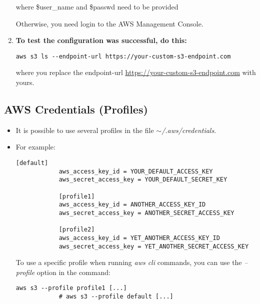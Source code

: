 \documentclass[12pt, a4paper]{article}
\numberwithin{equation}{section}
\theoremstyle{definition}
\theoremstyle{definition}
\begin{document}
\begin{enumerate}
		where \$user\_name and \$passwd need to be provided
		
		Otherwise, you need login to the AWS Management Console. 
		
		\item \textbf{To test the configuration was successful, do this:}
		
		\begin{lstlisting}[style=mystylebash, label=alg:aws_configure_test, xleftmargin=\parindent]
			aws s3 ls --endpoint-url https://your-custom-s3-endpoint.com
		\end{lstlisting}
		
		where you replace the endpoint-url \url{https://your-custom-s3-endpoint.com} with yours.
		
	\end{enumerate}

	\subsection{AWS Credentials (Profiles)}
	
	\begin{itemize}
		\item It is possible to use several profiles in the file \textit{$\sim$/.aws/credentials}. 
		\item For example:
		
		\begin{lstlisting}[style=mystylebash, label=alg:aws_profiles, xleftmargin=\parindent]
			[default]
			aws_access_key_id = YOUR_DEFAULT_ACCESS_KEY
			aws_secret_access_key = YOUR_DEFAULT_SECRET_KEY
			
			[profile1]                                                                   
			aws_access_key_id = ANOTHER_ACCESS_KEY_ID
			aws_secret_access_key = ANOTHER_SECRET_ACCESS_KEY
			
			[profile2]
			aws_access_key_id = YET_ANOTHER_ACCESS_KEY_ID
			aws_secret_access_key = YET_ANOTHER_SECRET_ACCESS_KEY
		\end{lstlisting}
	
		To use a specific profile when running \textit{aws cli} commands, you can use the \textit{--profile} option in the command:
		
		\begin{lstlisting}[style=mystylebash, label=alg:aws_cli__profile, xleftmargin=\parindent]
			aws s3 --profile profile1 [...]
			# aws s3 --profile default [...]
		\end{lstlisting}
		
	\end{itemize}
\end{document}
